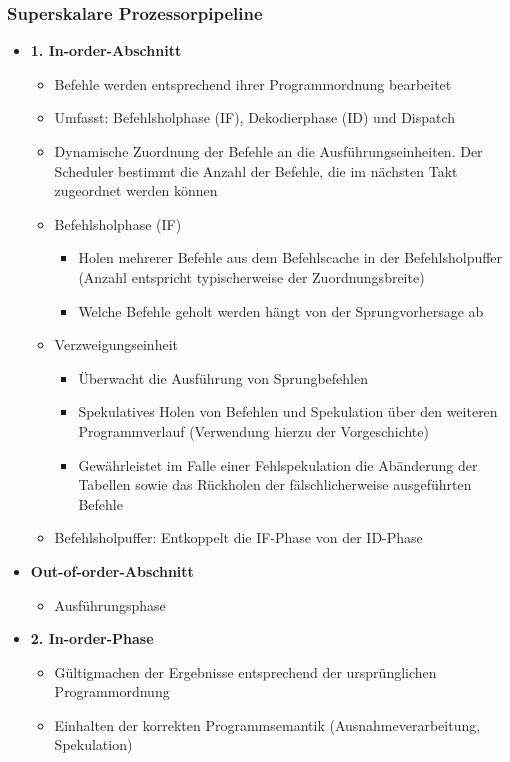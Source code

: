 \subsubsection{Superskalare Prozessorpipeline}
\begin{itemize}
	\item \textbf{1. In-order-Abschnitt}
	\begin{itemize}
		\item Befehle werden entsprechend ihrer Programmordnung bearbeitet
		\item Umfasst: Befehlsholphase (IF), Dekodierphase (ID) und Dispatch
		\item Dynamische Zuordnung der Befehle an die Ausführungseinheiten. Der Scheduler bestimmt die Anzahl der Befehle, die im nächsten Takt zugeordnet werden können
		\item Befehlsholphase (IF)
		\begin{itemize}
			\item Holen mehrerer Befehle aus dem Befehlscache in der Befehlsholpuffer (Anzahl entspricht typischerweise der Zuordnungsbreite)
			\item Welche Befehle geholt werden hängt von der Sprungvorhersage ab
		\end{itemize}
		\item Verzweigungseinheit
		\begin{itemize}
			\item Überwacht die Ausführung von Sprungbefehlen
			\item Spekulatives Holen von Befehlen und Spekulation über den weiteren Programmverlauf (Verwendung hierzu der Vorgeschichte)
			\item Gewährleistet im Falle einer Fehlspekulation die Abänderung der Tabellen sowie das Rückholen der fälschlicherweise ausgeführten Befehle
		\end{itemize}
		\item Befehlsholpuffer: Entkoppelt die IF-Phase von der ID-Phase
	\end{itemize}
	\item \textbf{Out-of-order-Abschnitt}
	\begin{itemize}
		\item Ausführungsphase
	\end{itemize}
	\item \textbf{2. In-order-Phase}
	\begin{itemize}
		\item Gültigmachen der Ergebnisse entsprechend der ursprünglichen Programmordnung
		\item Einhalten der korrekten Programmsemantik (Ausnahmeverarbeitung, Spekulation)
	\end{itemize}
\end{itemize}

